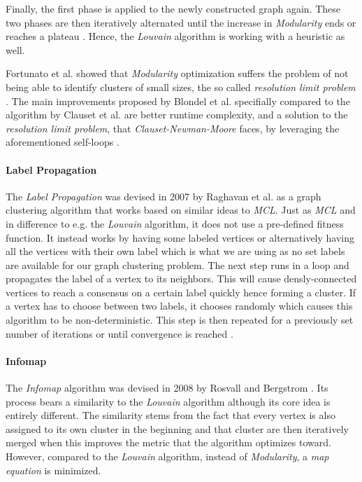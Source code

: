 \documentclass[12pt,a4paper]{report}
\begin{document}
Finally, the first phase is applied to the newly constructed graph again.
These two phases are then iteratively alternated until the increase in
\textit{Modularity} ends or reaches a plateau \cite{blondel2008modularity}.
Hence, the \textit{Louvain} algorithm is working with a heuristic as well.

Fortunato et al. showed that \textit{Modularity} optimization suffers
the problem of not being able to identify clusters of small sizes, the so called
\textit{resolution limit problem} \cite{fortunato2007resolution}.
The main improvements proposed by Blondel et al. specifially compared
to the algorithm by Clauset et al. are better runtime complexity, and a solution
to the \textit{resolution limit problem}, that \textit{Clauset-Newman-Moore}
faces, by leveraging the aforementioned self-loops \cite{blondel2008modularity}.

\paragraph{Label Propagation \cite{raghavan2007lpa}}
The \textit{Label Propagation} was devised in 2007 by Raghavan et al.
as a graph clustering algorithm that works based on similar ideas to \textit{MCL}.
Just as \textit{MCL} and in difference to e.g. the \textit{Louvain} algorithm,
it does not use a pre\hyp defined fitness function.
It instead works by having some labeled vertices or alternatively having
all the vertices with their own label which is what we are using as no set labels
are available for our graph clustering problem.
The next step runs in a loop and propagates the label of a vertex to its neighbors.
This will cause densly\hyp connected vertices to reach a consensus on a certain label
quickly hence forming a cluster. If a vertex has to choose between two labels,
it chooses randomly which causes this algorithm to be non\hyp deterministic.
This step is then repeated for a previously set number of iterations or until
convergence is reached \cite{raghavan2007lpa}.

\paragraph{Infomap \cite{rosvall2008infomap}}
The \textit{Infomap} algorithm was devised in 2008 by Rosvall and Bergstrom
\cite{rosvall2008infomap}.
Its process bears a similarity to the \textit{Louvain} algorithm although
its core idea is entirely different. The similarity stems from the fact
that every vertex is also assigned to its own cluster in the beginning and
that cluster are then iteratively merged when this improves the metric that
the algorithm optimizes toward. However, compared to the \textit{Louvain}
algorithm, instead of \textit{Modularity}, a \textit{map equation} is minimized.
\end{document}
